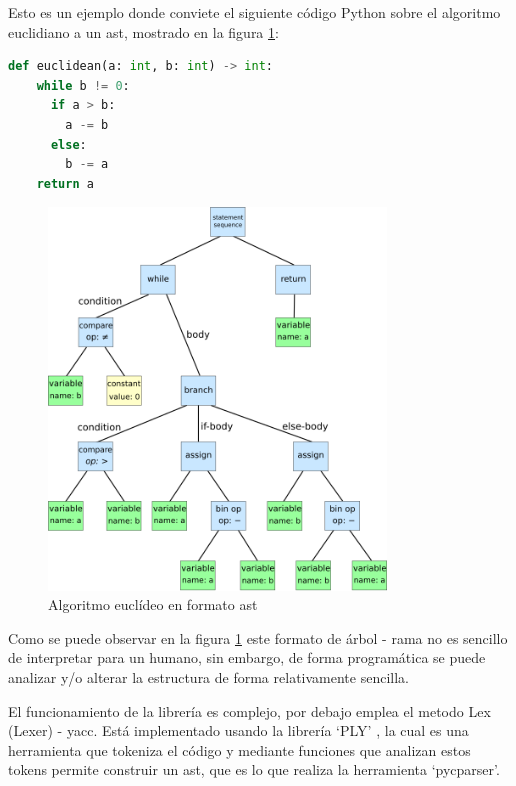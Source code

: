 Esto es un ejemplo donde conviete el siguiente código Python sobre el algoritmo euclidiano a un \acrshort{ast}, mostrado en la figura \ref{fig:ast}:

\begin{lstlisting}[language=Python, caption=Python - Algoritmo euclidiano]
def euclidean(a: int, b: int) -> int:
    while b != 0:
      if a > b:
        a -= b
      else:
        b -= a
    return a
\end{lstlisting}

\begin{figure}[htb!]
      \centering                        
      \includegraphics[width=0.8\textwidth]{images/AST.png}
      \caption{Algoritmo euclídeo en formato \acrshort{ast} }
      \label{fig:ast}
\end{figure}
\FloatBarrier
Como se puede observar en la figura \ref{fig:ast} este formato de árbol - rama no es sencillo de interpretar para un humano, sin embargo, de forma programática se puede analizar y/o alterar la estructura de forma relativamente sencilla.

El funcionamiento de la librería es complejo, por debajo emplea el metodo Lex (Lexer) - \acrfull{yacc}. Está implementado usando la librería `PLY' \cite{ply}, la cual es una herramienta que tokeniza el código y mediante funciones que analizan estos tokens permite construir un \acrshort{ast}, que es lo que realiza la herramienta `pycparser'.

